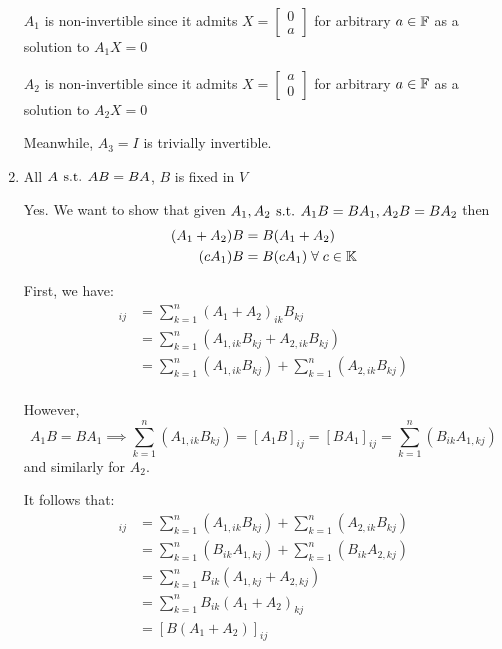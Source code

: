 \documentclass[a4paper, 11pt]{article}
\begin{document}
\begin{solution}
\begin{enumerate}
              \(A_1\) is non-invertible since it admits \(X = \left[\begin{array}{c}
                      0 \\ a
                  \end{array}\right]\) for arbitrary \(a \in \mathbb{F}\) as a solution to \(A_1X = 0\)

              \(A_2\) is non-invertible since it admits \(X = \left[\begin{array}{c}
                      a \\ 0
                  \end{array}\right]\) for arbitrary \(a \in \mathbb{F}\) as a solution to \(A_2X = 0\)

              Meanwhile, \(A_3 = I\) is trivially invertible.

        \item All \(A \hspace*{4pt}\text{s.t.}\hspace*{4pt} AB = BA\), \(B\) is fixed in \(V\)

              Yes. We want to show that given \(A_1, A_2 \hspace*{4pt}\text{s.t.}\hspace*{4pt} A_1B = BA_1, A_2B = BA_2\) then
              \begin{align*}
                  (A_1 + A_2)B & = B(A_1 + A_2)                 \\
                  (c A_1) B    & = B (c A_1) \forall c \in \bbk
              \end{align*}

              First, we have:
              \begin{align*}
                  [(A_1 + A_2)B]_{ij} & = \sum_{k=1}^{n}(A_1 + A_2)_{ik}B_{kj}                              \\
                                      & = \sum_{k=1}^{n}(A_{1, ik}B_{kj} + A_{2, ik}B_{kj})                 \\
                                      & = \sum_{k=1}^{n}(A_{1, ik}B_{kj}) + \sum_{k=1}^{n}(A_{2, ik}B_{kj}) \\
              \end{align*}

              However, \[
                  A_1B = BA_1 \implies \sum_{k=1}^{n}(A_{1, ik}B_{kj}) = [A_1B]_{ij} = [BA_1]_{ij} = \sum_{k=1}^{n}(B_{ik}A_{1, kj})
              \]
              and similarly for \(A_2\).

              It follows that:
              \begin{align*}
                  [(A_1 + A_2)B]_{ij} & =\sum_{k=1}^{n}(A_{1, ik}B_{kj}) + \sum_{k=1}^{n}(A_{2, ik}B_{kj})  \\
                                      & = \sum_{k=1}^{n}(B_{ik}A_{1, kj}) + \sum_{k=1}^{n}(B_{ik}A_{2, kj}) \\
                                      & = \sum_{k=1}^{n}B_{ik}(A_{1, kj} + A_{2, kj})                       \\
                                      & = \sum_{k=1}^{n}B_{ik}(A_1 + A_2)_{kj}                              \\
                                      & = [B(A_1 + A_2)]_{ij}
              \end{align*}


\end{enumerate}
\end{solution}
\end{document}
